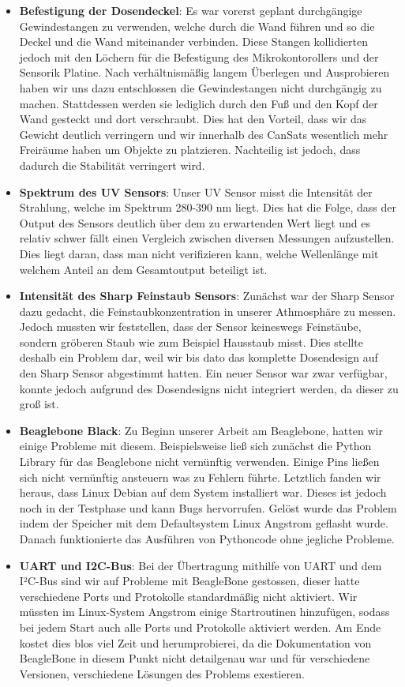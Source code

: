 \begin{itemize}
	\item \textbf{Befestigung der Dosendeckel}: Es war vorerst geplant durchgängige Gewindestangen zu verwenden, welche durch die Wand führen und so die Deckel und die Wand miteinander verbinden. Diese Stangen kollidierten jedoch mit den Löchern für die Befestigung des Mikrokontorollers und der Sensorik Platine. Nach verhältnismäßig langem Überlegen und Ausprobieren haben wir uns dazu entschlossen die Gewindestangen nicht durchgängig zu machen. Stattdessen werden sie lediglich durch den Fuß und den Kopf der Wand gesteckt und dort verschraubt. Dies hat den Vorteil, dass wir das Gewicht deutlich verringern und wir innerhalb des CanSats wesentlich mehr Freiräume haben um Objekte zu platzieren. Nachteilig ist jedoch, dass dadurch die Stabilität verringert wird.
	\item \textbf{Spektrum des UV Sensors}: Unser UV Sensor misst die Intensität der Strahlung, welche im Spektrum 280-390 nm liegt. Dies hat die Folge, dass der Output des Sensors deutlich über dem zu erwartenden Wert liegt und es relativ schwer fällt einen Vergleich zwischen diversen Messungen aufzustellen. Dies liegt daran, dass man nicht verifizieren kann, welche Wellenlänge mit welchem Anteil an dem Gesamtoutput beteiligt ist.
	\item \textbf{Intensität des Sharp Feinstaub Sensors}: Zunächst war der Sharp Sensor dazu gedacht, die Feinstaubkonzentration in unserer Athmosphäre zu messen. Jedoch mussten wir feststellen, dass der Sensor keineswegs Feinstäube, sondern gröberen Staub wie zum Beispiel Hausstaub misst. Dies stellte deshalb ein Problem dar, weil wir bis dato das komplette Dosendesign auf den Sharp Sensor abgestimmt hatten. Ein neuer Sensor war zwar verfügbar, konnte jedoch aufgrund des Dosendesigns nicht integriert werden, da dieser zu groß ist.
	\item \textbf{Beaglebone Black}: Zu Beginn unserer Arbeit am Beaglebone, hatten wir einige Probleme mit diesem. Beispielsweise ließ sich zunächst die Python Library für das Beaglebone nicht vernünftig verwenden. Einige Pins ließen sich nicht vernünftig ansteuern was zu Fehlern führte. Letztlich fanden wir heraus, dass Linux Debian auf dem System installiert war. Dieses ist jedoch noch in der Testphase und kann Bugs hervorrufen. Gelöst wurde das Problem indem der Speicher mit dem Defaultsystem Linux Angstrom geflasht wurde. Danach funktionierte das Ausführen von Pythoncode ohne jegliche Probleme.
	\item \textbf{UART und I2C-Bus}: Bei der Übertragung mithilfe von UART und dem I²C-Bus sind wir auf Probleme mit BeagleBone gestossen, dieser hatte verschiedene Ports und Protokolle standardmäßig nicht aktiviert. Wir müssten im Linux-System Angstrom einige Startroutinen hinzufügen, sodass bei jedem Start auch alle Ports und Protokolle aktiviert werden. Am Ende kostet dies blos viel Zeit und herumprobierei, da die Dokumentation von BeagleBone in diesem Punkt nicht detailgenau war und für verschiedene Versionen, verschiedene Lösungen des Problems exestieren.

\end{itemize}
